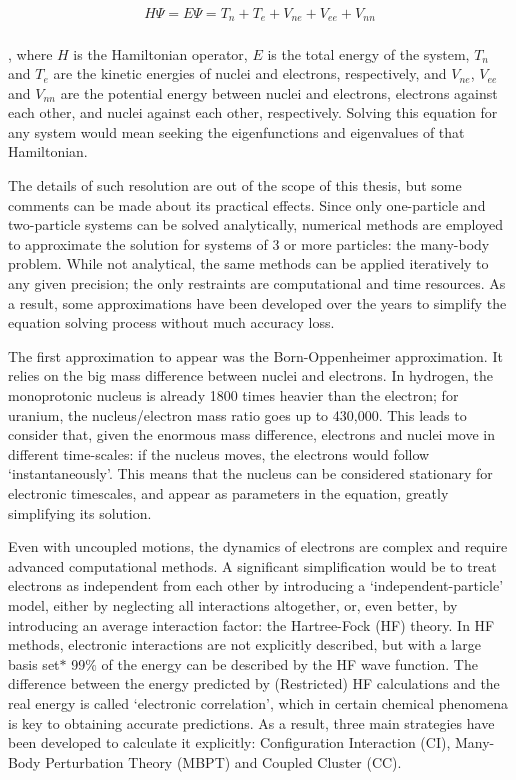 \begin{align}
	H \Psi =E \Psi =T_{n}+T_{e}+V_{ne}+V_{ee}+V_{nn} \\ \tag{Time-independent Schrödinger equation}
\end{align}

, where $H$ is the Hamiltonian operator, $E$ is the total energy of the system, $T_{n}$ and $T_{e}$ are the kinetic energies of nuclei and electrons, respectively, and $V_{ne}$, $V_{ee}$ and $V_{nn}$ are the potential energy between nuclei and electrons, electrons against each other, and nuclei against each other, respectively. Solving this equation for any system would mean seeking the eigenfunctions and eigenvalues of that Hamiltonian.

The details of such resolution are out of the scope of this thesis, but some comments can be made about its practical effects. Since only one-particle and two-particle systems can be solved analytically, numerical methods are employed to approximate the solution for systems of 3 or more particles: the many-body problem. While not analytical, the same methods can be applied iteratively to any given precision; the only restraints are computational and time resources. As a result, some approximations have been developed over the years to simplify the equation solving process without much accuracy loss.

The first approximation to appear was the Born-Oppenheimer approximation. It relies on the big mass difference between nuclei and electrons. In hydrogen, the monoprotonic nucleus is already 1800 times heavier than the electron; for uranium, the nucleus/electron mass ratio goes up to 430,000. This leads to consider that, given the enormous mass difference, electrons and nuclei move in different time-scales: if the nucleus moves, the electrons would follow ‘instantaneously’. This means that the nucleus can be considered stationary for electronic timescales, and appear as parameters in the equation, greatly simplifying its solution.

Even with uncoupled motions, the dynamics of electrons are complex and require advanced computational methods. A significant simplification would be to treat electrons as independent from each other by introducing a ‘independent-particle’ model, either by neglecting all interactions altogether, or, even better, by introducing an average interaction factor: the Hartree-Fock (HF) theory. In HF methods, electronic interactions are not explicitly described, but with a large basis set$\ast$  99$\%$  of the energy can be described by the HF wave function. The difference between the energy predicted by (Restricted) HF calculations and the real energy is called ‘electronic correlation’, which in certain chemical phenomena is key to obtaining accurate predictions. As a result, three main strategies have been developed to calculate it explicitly: Configuration Interaction (CI), Many-Body Perturbation Theory (MBPT) and Coupled Cluster (CC).

